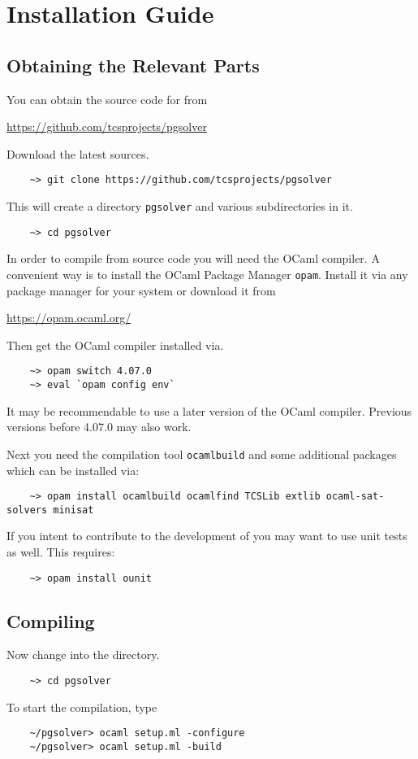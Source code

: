 \section{Installation Guide}

\subsection{Obtaining the Relevant Parts}

You can obtain the source code for \pgsolver from
\begin{center}
    \url{https://github.com/tcsprojects/pgsolver}
\end{center}
Download the latest sources.
\begin{verbatim}
    ~> git clone https://github.com/tcsprojects/pgsolver
\end{verbatim}
This will create a directory \texttt{pgsolver} and various subdirectories in it.
\begin{verbatim}
    ~> cd pgsolver
\end{verbatim}

In order to compile \pgsolver from source code you will need the OCaml compiler. A convenient way is to install the OCaml 
Package Manager \texttt{opam}. Install it via any package manager for your system or download it from
\begin{center}
\url{https://opam.ocaml.org/}
\end{center}
Then get the OCaml compiler installed via.
\begin{verbatim}
    ~> opam switch 4.07.0 
    ~> eval `opam config env`
\end{verbatim}
It may be recommendable to use a later version of the OCaml compiler. Previous versions before 4.07.0 may also work.

Next you need the compilation tool \texttt{ocamlbuild} and some additional packages which can be installed via:
\begin{verbatim}
    ~> opam install ocamlbuild ocamlfind TCSLib extlib ocaml-sat-solvers minisat
\end{verbatim}

If you intent to contribute to the development of \pgsolver you may want to use unit tests as well. This requires:
\begin{verbatim}
    ~> opam install ounit
\end{verbatim}



\subsection{Compiling \pgsolver}

Now change into the \pgsolver directory.
\begin{verbatim}
    ~> cd pgsolver
\end{verbatim}

To start the compilation, type 
\begin{verbatim}
    ~/pgsolver> ocaml setup.ml -configure
    ~/pgsolver> ocaml setup.ml -build
\end{verbatim}

